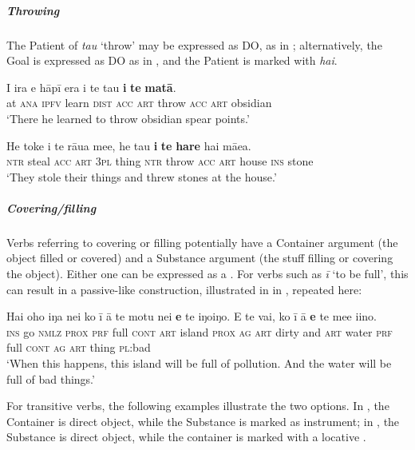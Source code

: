 \subparagraph{Throwing} The Patient of \textit{tau} ‘throw’ may be expressed as DO, as in ; alternatively, the Goal is expressed as DO as in , and the Patient is marked with \textit{hai}.

\ea\label{ex:8.136}
\gll {\ꞌ}I ira e hāpī era i te tau \textbf{i} \textbf{te} \textbf{matā}. \\
at \textsc{ana} \textsc{ipfv} learn \textsc{dist} \textsc{acc} \textsc{art} throw \textsc{acc} \textsc{art} obsidian \\

\glt 
‘There he learned to throw obsidian spear points.’ \textstyleExampleref{[R304.003]} 
\z

\ea\label{ex:8.137}
\gll He toke i te rāua me{\ꞌ}e, he tau \textbf{i} \textbf{te} \textbf{hare} hai mā{\ꞌ}ea. \\
\textsc{ntr} steal \textsc{acc} \textsc{art} \textsc{3pl} thing \textsc{ntr} throw \textsc{acc} \textsc{art} house \textsc{ins} stone \\

\glt
‘They stole their things and threw stones at the house.’ \textstyleExampleref{[R231.278]} 
\z

\subparagraph{Covering/filling} Verbs referring to covering or filling potentially have a Container argument (the object filled or covered) and a Substance argument (the stuff filling or covering the object). Either one can be expressed as a . For  verbs such as \textit{{\ꞌ}ī} ‘to be full’, this can result in a passive-like construction, illustrated in  in , repeated here:

\ea\label{ex:8.65a}
\gll Hai oho iŋa nei ko {\ꞌ}ī {\ꞌ}ā te motu nei \textbf{e} te iŋoiŋo. {\ꞌ}E te vai, ko {\ꞌ}ī {\ꞌ}ā \textbf{e} te me{\ꞌ}e {\ꞌ}i{\ꞌ}ino. \\
\textsc{ins} go \textsc{nmlz} \textsc{prox} \textsc{prf} full \textsc{cont} \textsc{art} island \textsc{prox} \textsc{ag} \textsc{art} dirty and \textsc{art} water \textsc{prf} full \textsc{cont} \textsc{ag} \textsc{art} thing \textsc{pl}:bad \\

\glt
‘When this happens, this island will be full of pollution. And the water will be full of bad things.’ \textstyleExampleref{[R649.119]} 
\z

For transitive verbs, the following examples illustrate the two options. In , the Container is direct object, while the Substance is marked as instrument; in , the Substance is direct object, while the container is marked with a locative . 

